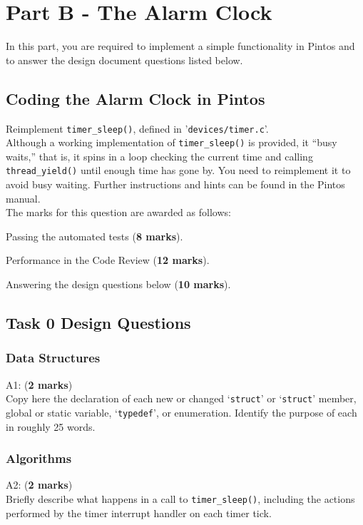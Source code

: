 \documentclass[a4paper,12pt]{article}
\newcommand{\shell}[1]{\lstinline!#1!}
\begin{document}
\section*{Part B - The Alarm Clock}

In this part, you are required to implement a simple functionality in Pintos and to answer the design document questions listed below.

\subsection*{Coding the Alarm Clock in Pintos} 
Reimplement \shell{timer_sleep()}, defined in '\shell{devices/timer.c}’.\\ 

\noindent Although a working implementation of \shell{timer_sleep()} is provided, it “busy waits,” that is, 
it spins in a loop checking the current time and calling \shell{thread_yield()} until enough time has gone by. 
You need to reimplement it to avoid busy waiting. 
Further instructions and hints can be found in the Pintos manual.\\

\noindent The marks for this question are awarded as follows:

Passing the automated tests ({\bf 8 marks}). 

Performance in the Code Review ({\bf 12 marks}). 

Answering the design questions below ({\bf 10 marks}).

\subsection*{Task 0 Design Questions}

\subsubsection*{Data Structures}
A1: ({\bf 2 marks}) \\
Copy here the declaration of each new or changed `\shell{struct}' or `\shell{struct}' member, 
global or static variable, `\shell{typedef}', or enumeration. Identify the purpose of each in roughly 25 words.

\subsubsection*{Algorithms}
A2: ({\bf 2 marks}) \\
Briefly describe what happens in a call to \shell{timer_sleep()}, including the actions performed by the timer interrupt handler on each timer tick. \\
\end{document}

